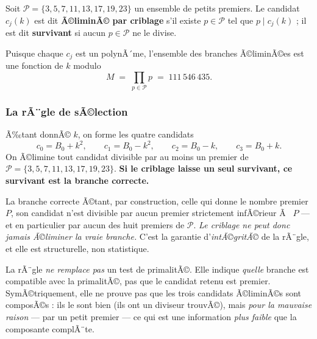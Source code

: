 \begin{boiteformule}
Soit $\mathcal{P} = \{3,5,7,11,13,17,19,23\}$ un ensemble de petits
premiers. Le candidat $c_j(k)$ est dit \textbf{Ã©liminÃ© par criblage} s'il
existe $p \in \mathcal{P}$ tel que $p \mid c_j(k)$ ; il est dit
\textbf{survivant} si aucun $p \in \mathcal{P}$ ne le divise.
\end{boiteformule}

Puisque chaque $c_j$ est un polynÃ´me, l'ensemble des branches Ã©liminÃ©es
est une fonction de $k$ modulo
\[
  M \;=\; \prod_{p \in \mathcal{P}} p \;=\; 111\,546\,435 .
\]

\subsubsection{La rÃ¨gle de sÃ©lection}

\begin{boiteformule}
Ã‰tant donnÃ© $k$, on forme les quatre candidats
\[
  c_0 = B_0+k^{2},\qquad c_1 = B_0-k^{2},\qquad
  c_2 = B_0-k,\qquad c_3 = B_0+k .
\]
On Ã©limine tout candidat divisible par au moins un premier de
$\mathcal{P} = \{3,5,7,11,13,17,19,23\}$. \textbf{Si le criblage laisse un
seul survivant, ce survivant est la branche correcte.}
\end{boiteformule}

\begin{boitenote}
La branche correcte Ã©tant, par construction, celle qui donne le
nombre premier $P$, son candidat n'est divisible par aucun premier
strictement infÃ©rieur Ã  $P$ --- et en particulier par aucun des huit
premiers de $\mathcal{P}$. \emph{Le criblage ne peut donc jamais
Ã©liminer la vraie branche.} C'est la garantie d'\emph{intÃ©gritÃ©} de la
rÃ¨gle, et elle est structurelle, non statistique.
\end{boitenote}

\begin{boitealerte}
La rÃ¨gle \emph{ne remplace pas} un test de primalitÃ©. Elle indique
\emph{quelle} branche est compatible avec la primalitÃ©, pas que le
candidat retenu est premier. SymÃ©triquement, elle ne prouve pas que les
trois candidats Ã©liminÃ©s sont composÃ©s : ils le sont bien (ils ont un
diviseur trouvÃ©), mais \emph{pour la mauvaise raison} --- par un petit
premier --- ce qui est une information \emph{plus faible} que la
composante complÃ¨te.
\end{boitealerte}

